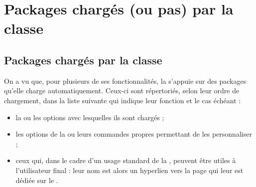 \chapter{Packages chargés (ou pas) par la classe}\label{cha-packages-charges}

\section{Packages chargés par la classe}\label{sec-packages-charges-par}

On a vu  que, pour plusieurs de ses
fonctionnalités, la \yatCl{} s'appuie sur des packages
qu'elle charge automatiquement. Ceux-ci sont répertoriés, selon leur ordre de
chargement, dans la liste suivante qui indique leur fonction et le cas échéant :
\begin{itemize}
\item la ou les options avec lesquelles ils sont chargés ;
\item les options de la \yatCl{} ou leurs commandes propres permettant de les
  personnaliser ;
\item ceux qui, dans le cadre d'un usage standard de la \yatCl{}, peuvent être
  utiles à l'utilisateur final : leur nom est alors un hyperlien vers la page
  qui leur est dédiée sur le .
\end{itemize}

